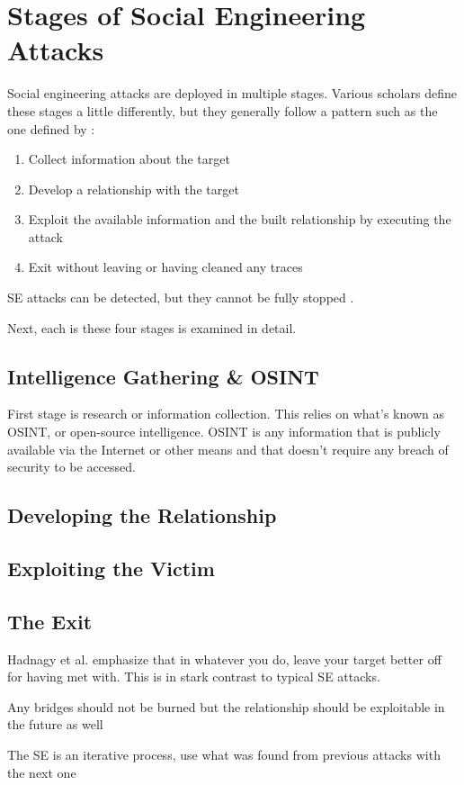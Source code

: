 



\chapter{Stages of Social Engineering Attacks\label{stages}}

Social engineering attacks are deployed in multiple stages. Various scholars define these stages a little differently, but they generally follow a pattern such as the one defined by \cite{salahdine_social_2019}:

\begin{enumerate}
    \item Collect information about the target
    \item Develop a relationship with the target
    \item Exploit the available information and the built relationship by executing the attack
    \item Exit without leaving or having cleaned any traces
\end{enumerate}

SE attacks can be detected, but they cannot be fully stopped \citep{wang_defining_2020}.

Next, each is these four stages is examined in detail.

\section{Intelligence Gathering \& OSINT}

First stage is research or information collection. This relies on what's known as OSINT, or open-source intelligence. OSINT is any information that is publicly available via the Internet or other means and that doesn't require any breach of security to be accessed.

\section{Developing the Relationship}

\section{Exploiting the Victim}

\section{The Exit}

Hadnagy et al. emphasize that in whatever you do, leave your target better off for having met with. This is in stark contrast to typical SE attacks.

Any bridges should not be burned but the relationship should be exploitable in the future as well

The SE is an iterative process, use what was found from previous attacks with the next one